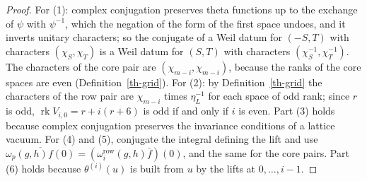 \begin{proof}
For (1): complex conjugation preserves theta functions up to the exchange of
$\psi$ with $\psi^{-1}$, which the negation of the form of the first space
undoes, and it inverts unitary characters; so the conjugate of a Weil datum
for $(-S,T)$ with characters $(\chi_S,\chi_T)$ is a Weil datum for $(S,T)$
with characters $(\chi_S^{-1},\chi_T^{-1})$. The characters of the core pair are
$(\chi_{m-i},\chi_{m-i})$, because the ranks of the core spaces are even
(Definition~\ref{th-grid}). For (2): by Definition~\ref{th-grid} the characters
of the row pair are $\chi_{m-i}$ times $\eta_L^{-1}$ for each space of odd rank;
since $r$ is odd, $\operatorname{rk}V_{i,0}=r+i(r+6)$ is odd if and only if $i$
is even. Part (3) holds because complex conjugation preserves the invariance
conditions of a lattice vacuum. For (4) and (5), conjugate the integral
defining the lift and use
$\overline{\omega_p(g,h)f(0)}=(\omega^{\mathrm{row}}_i(g,h)\bar f)(0)$, and the
same for the core pairs. Part (6) holds because $\theta^{(i)}(u)$ is built from
$u$ by the lifts at $0,\ldots,i-1$.
\end{proof}

